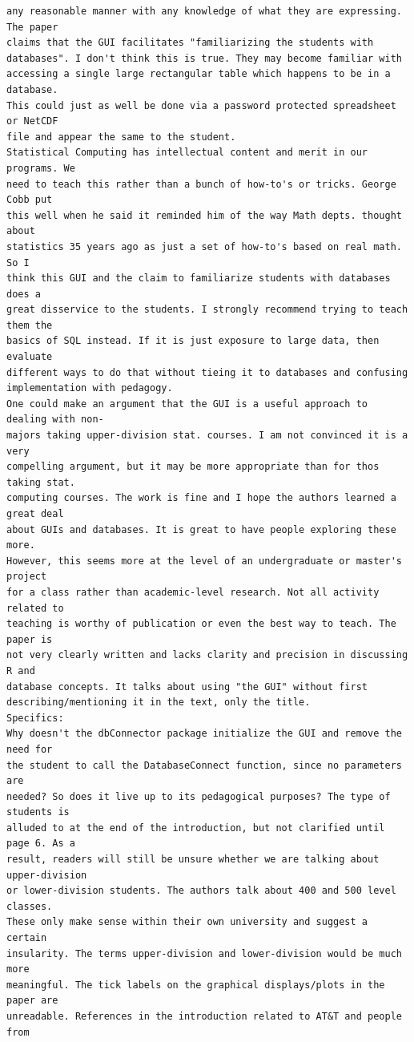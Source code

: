 \documentclass[11pt]{tise_style}
\begin{document}
\begin{verbatim}
any reasonable manner with any knowledge of what they are expressing. The paper
claims that the GUI facilitates "familiarizing the students with
databases". I don't think this is true. They may become familiar with
accessing a single large rectangular table which happens to be in a database.
This could just as well be done via a password protected spreadsheet or NetCDF
file and appear the same to the student.
Statistical Computing has intellectual content and merit in our programs. We
need to teach this rather than a bunch of how-to's or tricks. George Cobb put
this well when he said it reminded him of the way Math depts. thought about
statistics 35 years ago as just a set of how-to's based on real math. So I
think this GUI and the claim to familiarize students with databases does a
great disservice to the students. I strongly recommend trying to teach them the
basics of SQL instead. If it is just exposure to large data, then evaluate
different ways to do that without tieing it to databases and confusing
implementation with pedagogy.
One could make an argument that the GUI is a useful approach to dealing with non-
majors taking upper-division stat. courses. I am not convinced it is a very
compelling argument, but it may be more appropriate than for thos taking stat.
computing courses. The work is fine and I hope the authors learned a great deal
about GUIs and databases. It is great to have people exploring these more.
However, this seems more at the level of an undergraduate or master's project
for a class rather than academic-level research. Not all activity related to
teaching is worthy of publication or even the best way to teach. The paper is
not very clearly written and lacks clarity and precision in discussing R and
database concepts. It talks about using "the GUI" without first
describing/mentioning it in the text, only the title.
Specifics:
Why doesn't the dbConnector package initialize the GUI and remove the need for
the student to call the DatabaseConnect function, since no parameters are
needed? So does it live up to its pedagogical purposes? The type of students is
alluded to at the end of the introduction, but not clarified until page 6. As a
result, readers will still be unsure whether we are talking about upper-division
or lower-division students. The authors talk about 400 and 500 level classes.
These only make sense within their own university and suggest a certain
insularity. The terms upper-division and lower-division would be much more
meaningful. The tick labels on the graphical displays/plots in the paper are
unreadable. References in the introduction related to AT&T and people from

\end{verbatim}
\end{document}

